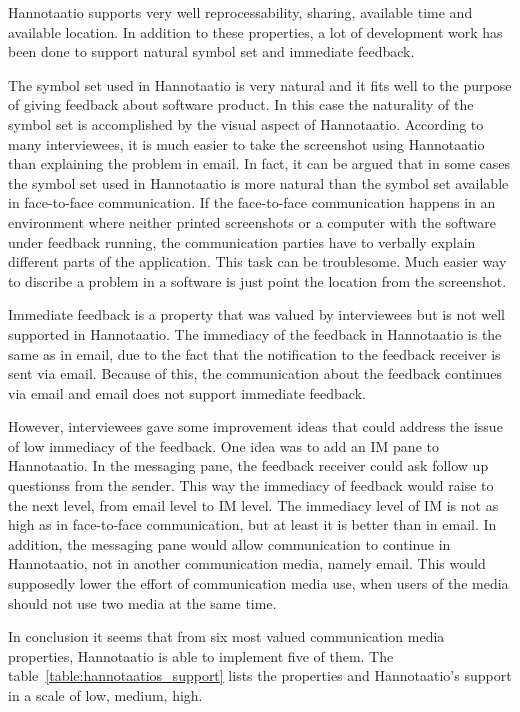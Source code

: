 \documentclass[english,12pt,a4paper,pdftex]{article}
\begin{document}
Hannotaatio supports very well reprocessability, sharing, available time and available location. In addition to these properties, a lot of development work has been done to support natural symbol set and immediate feedback. 

The symbol set used in Hannotaatio is very natural and it fits well to the purpose of giving feedback about software product. In this case the naturality of the symbol set is accomplished by the visual aspect of Hannotaatio. According to many interviewees, it is much easier to take the screenshot using Hannotaatio than explaining the problem in email. In fact, it can be argued that in some cases the symbol set used in Hannotaatio is more natural than the symbol set available in face-to-face communication. If the face-to-face communication happens in an environment where neither printed screenshots or a computer with the software under feedback running, the communication parties have to verbally explain different parts of the application. This task can be troublesome. Much easier way to discribe a problem in a software is just point the location from the screenshot.

Immediate feedback is a property that was valued by interviewees but is not well supported in Hannotaatio. The immediacy of the feedback in Hannotaatio is the same as in email, due to the fact that the notification to the feedback receiver is sent via email. Because of this, the communication about the feedback continues via email and email does not support immediate feedback.

However, interviewees gave some improvement ideas that could address the issue of low immediacy of the feedback. One idea was to add an \ac{IM} pane to Hannotaatio. In the messaging pane, the feedback receiver could ask follow up questionss from the sender. This way the immediacy of feedback would raise to the next level, from email level to \ac{IM} level. The immediacy level of \ac{IM} is not as high as in face-to-face communication, but at least it is better than in email. In addition, the messaging pane would allow communication to continue in Hannotaatio, not in another communication media, namely email. This would supposedly lower the effort of communication media use, when users of the media should not use two media at the same time.

In conclusion it seems that from six most valued communication media properties, Hannotaatio is able to implement  five of them. The table~\ref{table:hannotaatios_support} lists the properties and Hannotaatio's support in a scale of low, medium, high.
\end{document}
